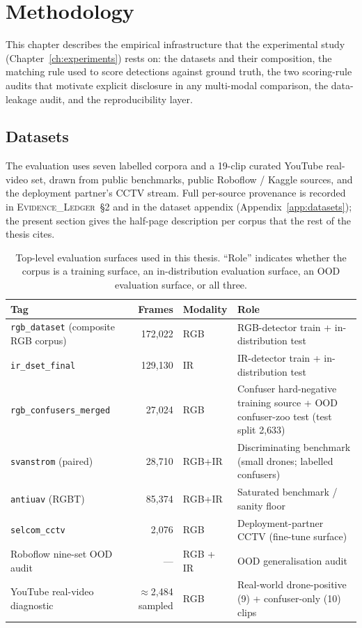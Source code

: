 \documentclass[12pt,a4paper,oneside,openright]{book}
\begin{document}
\chapter{Methodology}
\label{ch:methodology}

This chapter describes the empirical infrastructure that the experimental study (Chapter~\ref{ch:experiments}) rests on: the datasets and their composition, the matching rule used to score detections against ground truth, the two scoring-rule audits that motivate explicit disclosure in any multi-modal comparison, the data-leakage audit, and the reproducibility layer.

\section{Datasets}
\label{sec:datasets}

The evaluation uses seven labelled corpora and a 19-clip curated YouTube real-video set, drawn from public benchmarks, public Roboflow / Kaggle sources, and the deployment partner's CCTV stream. Full per-source provenance is recorded in \textsc{Evidence\_Ledger}~\S2 and in the dataset appendix (Appendix~\ref{app:datasets}); the present section gives the half-page description per corpus that the rest of the thesis cites.

\begin{table}[htbp]
    \centering
    \caption{Top-level evaluation surfaces used in this thesis. ``Role'' indicates whether the corpus is a training surface, an in-distribution evaluation surface, an OOD evaluation surface, or all three.}
    \label{tab:datasets}
    \begin{tabular}{lrlp{5.6cm}}
        \toprule
        Tag & Frames & Modality & Role \\
        \midrule
        \texttt{rgb\_dataset} (composite RGB corpus) & 172,022 & RGB & RGB-detector train + in-distribution test \\
        \texttt{ir\_dset\_final} & 129,130 & IR & IR-detector train + in-distribution test \\
        \texttt{rgb\_confusers\_merged} & 27,024 & RGB & Confuser hard-negative training source + OOD confuser-zoo test (test split 2{,}633) \\
        \texttt{svanstrom} (paired) & 28,710 & RGB+IR & Discriminating benchmark (small drones; labelled confusers) \\
        \texttt{antiuav} (RGBT) & 85,374 & RGB+IR & Saturated benchmark / sanity floor \\
        \texttt{selcom\_cctv} & 2,076 & RGB & Deployment-partner CCTV (fine-tune surface) \\
        Roboflow nine-set OOD audit & --- & RGB + IR & OOD generalisation audit \\
        YouTube real-video diagnostic & $\approx$2{,}484 sampled & RGB & Real-world drone-positive (9) + confuser-only (10) clips \\
        \bottomrule
    \end{tabular}
\end{table}
\end{document}
